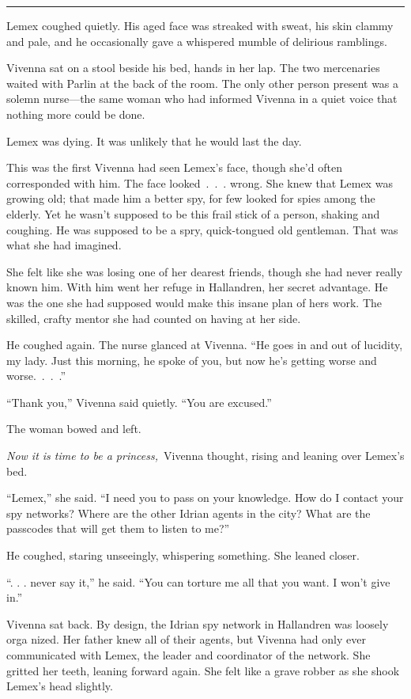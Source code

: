 \bigskip \hrule \bigskip

Lemex coughed quietly. His aged face was streaked with sweat, his skin clammy and pale, and he occasionally gave a whispered mumble of delirious ramblings.

Vivenna sat on a stool beside his bed, hands in her lap. The two mercenaries waited with Parlin at the back of the room. The only other person present was a solemn nurse—the same woman who had informed Vivenna in a quiet voice that nothing more could be done.

Lemex was dying. It was unlikely that he would last the day.

This was the first Vivenna had seen Lemex’s face, though she’d often corresponded with him. The face looked~.~.~. wrong. She knew that Lemex was growing old; that made him a better spy, for few looked for spies among the elderly. Yet he wasn’t supposed to be this frail stick of a person, shaking and coughing. He was supposed to be a spry, quick-tongued old gentleman. That was what she had imagined.

She felt like she was losing one of her dearest friends, though she had never really known him. With him went her refuge in Hallandren, her secret advantage. He was the one she had supposed would make this insane plan of hers work. The skilled, crafty mentor she had counted on having at her side.

He coughed again. The nurse glanced at Vivenna. “He goes in and out of lucidity, my lady. Just this morning, he spoke of you, but now he’s getting worse and worse.~.~.~.”

“Thank you,” Vivenna said quietly. “You are excused.”

The woman bowed and left.

\textit{Now it is time to be a princess,}~Vivenna thought, rising and leaning over Lemex’s bed.

“Lemex,” she said. “I need you to pass on your knowledge. How do I contact your spy networks? Where are the other Idrian agents in the city? What are the passcodes that will get them to listen to me?”

He coughed, staring unseeingly, whispering something. She leaned closer.

“. . . never say it,” he said. “You can torture me all that you want. I won’t give in.”

Vivenna sat back. By design, the Idrian spy network in Hallandren was loosely orga nized. Her father knew all of their agents, but Vivenna had only ever communicated with Lemex, the leader and coordinator of the network. She gritted her teeth, leaning forward again. She felt like a grave robber as she shook Lemex’s head slightly.

